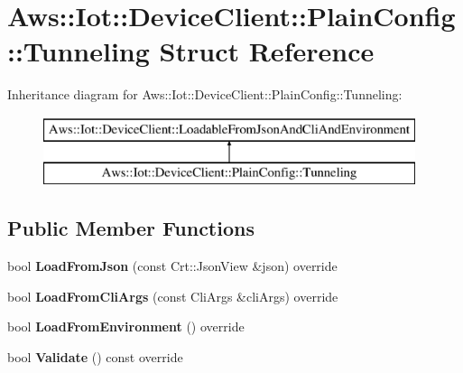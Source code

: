 \hypertarget{struct_aws_1_1_iot_1_1_device_client_1_1_plain_config_1_1_tunneling}{}\section{Aws\+:\+:Iot\+:\+:Device\+Client\+:\+:Plain\+Config\+:\+:Tunneling Struct Reference}
\label{struct_aws_1_1_iot_1_1_device_client_1_1_plain_config_1_1_tunneling}
Inheritance diagram for Aws\+:\+:Iot\+:\+:Device\+Client\+:\+:Plain\+Config\+:\+:Tunneling\+:\begin{figure}[H]
\begin{center}
\leavevmode
\includegraphics[height=2.000000cm]{struct_aws_1_1_iot_1_1_device_client_1_1_plain_config_1_1_tunneling}
\end{center}
\end{figure}
\subsection*{Public Member Functions}
\begin{DoxyCompactItemize}
\item 
\mbox{\label{struct_aws_1_1_iot_1_1_device_client_1_1_plain_config_1_1_tunneling_a561dfb1259926bfe31d8c03bad4eef7d}} 
bool {\bfseries Load\+From\+Json} (const Crt\+::\+Json\+View \&json) override
\item 
\mbox{\label{struct_aws_1_1_iot_1_1_device_client_1_1_plain_config_1_1_tunneling_ad5321178f74957eef3c6a91f1b3dbb7b}} 
bool {\bfseries Load\+From\+Cli\+Args} (const Cli\+Args \&cli\+Args) override
\item 
\mbox{\label{struct_aws_1_1_iot_1_1_device_client_1_1_plain_config_1_1_tunneling_aa4b606a5192cba3a72300ea1bc62b791}} 
bool {\bfseries Load\+From\+Environment} () override
\item 
\mbox{\label{struct_aws_1_1_iot_1_1_device_client_1_1_plain_config_1_1_tunneling_a90ec2cff99ff6fb0bb0e50aaa48bb42b}} 
bool {\bfseries Validate} () const override
\end{DoxyCompactItemize}

